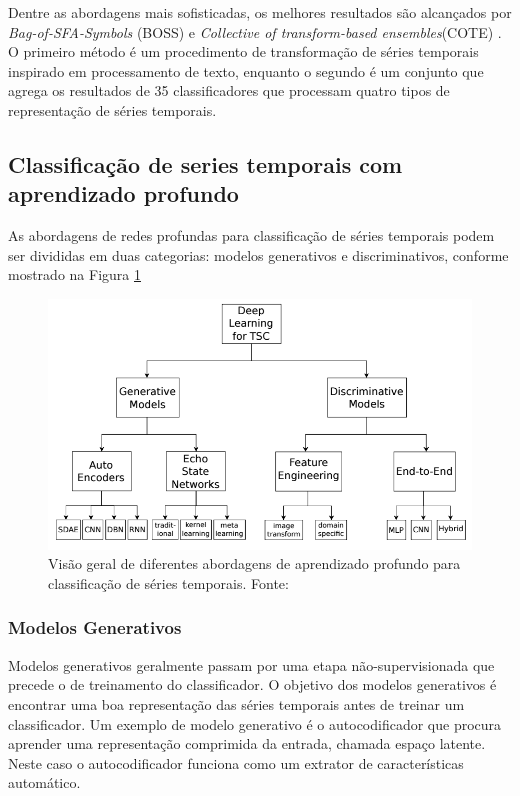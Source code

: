 Dentre as abordagens mais sofisticadas, os melhores resultados são alcançados por \textit{Bag-of-SFA-Symbols} (BOSS)\cite{schafer2015} e \textit{Collective of transform-based ensembles}(COTE) \cite{bagnall2015}. O primeiro método é um procedimento de transformação de séries temporais inspirado em processamento de texto, enquanto o segundo é um conjunto que agrega os resultados de 35 classificadores que processam quatro tipos de representação de séries temporais.

\subsection{Classificação de series temporais com aprendizado profundo}

As abordagens de redes profundas para classificação de séries temporais podem ser divididas em duas categorias\cite{ismail2018}: modelos generativos e discriminativos, conforme mostrado na Figura \ref{fig-dnn-overview} 

\begin{figure}[H]
	\centering
	\includegraphics[scale=0.4]{pasta1_figuras/dnn-tsc.png}
	\caption {Visão geral de diferentes abordagens de aprendizado profundo para classificação de séries temporais. Fonte: \cite{ismail2018}}
	\label{fig-dnn-overview}
\end{figure}

\subsubsection{Modelos Generativos}
Modelos generativos geralmente passam por uma etapa não-supervisionada que precede o de treinamento do classificador. O objetivo dos modelos generativos é encontrar uma boa representação das séries temporais antes de treinar um classificador. Um exemplo de modelo generativo é o autocodificador que procura aprender uma representação comprimida da entrada, chamada espaço latente. Neste caso o autocodificador funciona como um extrator de características automático.

